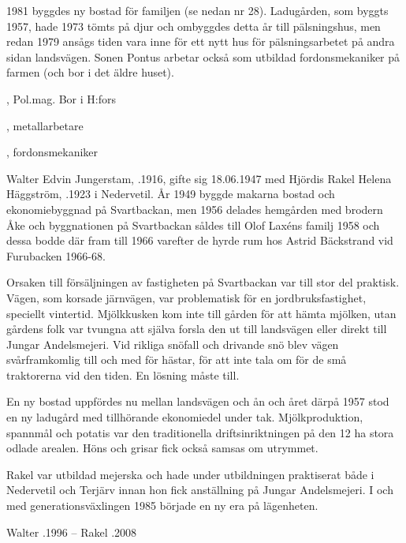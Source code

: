 1981 byggdes ny bostad för familjen (se nedan nr 28). Ladugården, som byggts 1957, hade 1973 tömts på djur och ombyggdes detta år till pälsningshus, men redan 1979 ansågs tiden vara inne för ett nytt hus för pälsningsarbetet på andra sidan landsvägen. Sonen Pontus arbetar också som utbildad fordonsmekaniker på farmen (och bor i det äldre huset).
\begin{jhchildren}
  \item {}, Pol.mag. Bor i H:fors
  \item {}, metallarbetare
  \item {}, fordonsmekaniker
\end{jhchildren}


Walter Edvin Jungerstam, .1916, gifte sig 18.06.1947 med Hjördis Rakel Helena Häggström, .1923 i Nedervetil. År 1949 byggde makarna bostad och ekonomiebyggnad på Svartbackan, men 1956 delades hemgården med brodern Åke och byggnationen på Svartbackan såldes till Olof Laxéns familj 1958 och dessa bodde där fram till 1966 varefter de hyrde rum hos Astrid Bäckstrand vid Furubacken 1966-68.

Orsaken till försäljningen av fastigheten på Svartbackan var till stor del praktisk. Vägen, som korsade järnvägen, var problematisk för en jordbruksfastighet, speciellt vintertid. Mjölkkusken kom inte till gården för att hämta mjölken, utan gårdens folk var tvungna att själva forsla den ut till landsvägen eller direkt till Jungar Andelsmejeri. Vid rikliga snöfall och drivande snö blev vägen svårframkomlig till och med för hästar, för att inte tala om för de små traktorerna vid den tiden. En lösning måste till.

En ny bostad uppfördes nu mellan landsvägen och ån och året därpå 1957 stod en ny ladugård med tillhörande ekonomiedel under tak. Mjölkproduktion, spannmål och potatis var den traditionella driftsinriktningen på den 12 ha stora odlade arealen. Höns och grisar fick också samsas om utrymmet.

Rakel var utbildad mejerska och hade under utbildningen praktiserat både i Nedervetil och Terjärv innan hon fick anställning på Jungar Andelsmejeri. I och med generationsväxlingen 1985 började en ny era på lägenheten.
\begin{jhchildren}
  \item {}
  \item {}
\end{jhchildren}
Walter .1996  --  Rakel .2008

